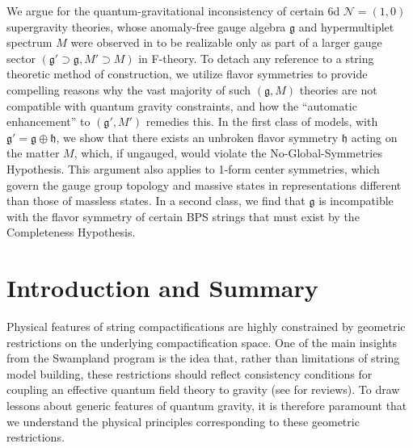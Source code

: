 \documentclass[11pt, a4paper]{article}
\newcommand*{\cN}{\ensuremath{\mathcal{N}}}
\newcommand*{\fkg}{\ensuremath{\mathfrak{g}}}
\newcommand*{\fkh}{\ensuremath{\mathfrak{h}}}
\begin{document}
\noindent
We argue for the quantum-gravitational inconsistency of certain 6d $\cN=(1,0)$ supergravity theories, whose anomaly-free gauge algebra $\fkg$ and hypermultiplet spectrum $M$ were observed in \cite{Raghuram:2020vxm} to be realizable only as part of a larger gauge sector $(\fkg' \supset \fkg, M' \supset M)$ in F-theory.
To detach any reference to a string theoretic method of construction, we utilize flavor symmetries to provide compelling reasons why the vast majority of such $(\fkg,M)$ theories are not compatible with quantum gravity constraints, and how the ``automatic enhancement'' to $(\fkg', M')$ remedies this.
In the first class of models, with $\fkg' = \fkg \oplus \fkh$, we show that there exists an unbroken flavor symmetry $\fkh$ acting on the matter $M$, which, if ungauged, would violate the No-Global-Symmetries Hypothesis.
This argument also applies to 1-form center symmetries, which govern the gauge group topology and massive states in representations different than those of massless states.
In a second class, we find that $\fkg$ is incompatible with the flavor symmetry of certain BPS strings that must exist by the Completeness Hypothesis.




\newpage
\setcounter{tocdepth}{2}
\tableofcontents



\section{Introduction and Summary}


Physical features of string compactifications are highly constrained by geometric restrictions on the underlying compactification space.
One of the main insights from the Swampland program \cite{Vafa:2005ui} is the idea that, rather than limitations of string model building, these restrictions should reflect consistency conditions for coupling an effective quantum field theory to gravity (see \cite{Brennan:2017rbf,Palti:2019pca,vanBeest:2021lhn} for reviews).
To draw lessons about generic features of quantum gravity, it is therefore paramount that we understand the physical principles corresponding to these geometric restrictions.
\end{document}
